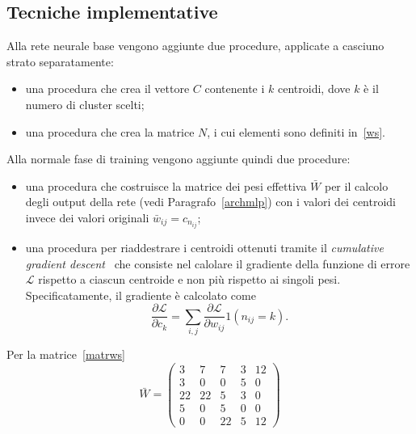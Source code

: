 \documentclass[11pt,a4paper,twoside,
openright]{book}
\begin{document}
\subsection{Tecniche implementative}
\label{implws}
Alla rete neurale base vengono aggiunte due procedure, applicate a casciuno strato separatamente:
\begin{itemize}
\item una procedura che crea il vettore $C$ contenente i $k$ centroidi, dove $k$ è il numero di cluster scelti;
\item una procedura che crea la matrice $N$, i cui elementi sono definiti in~\eqref{ws}.
\end{itemize}
Alla normale fase di training vengono aggiunte quindi due procedure:
\begin{itemize}
\item una procedura che costruisce la matrice dei pesi effettiva $\bar{W}$ per il calcolo degli output della rete (vedi Paragrafo~\ref{archmlp}) con i valori dei centroidi invece dei valori originali $\bar{w}_{ij} = c_{n_{ij}}$;
\item una procedura per riaddestrare i centroidi ottenuti tramite il \textit{cumulative gradient descent}~\cite{han2015compression} che consiste nel calolare il gradiente della funzione di errore $\mathcal{L}$ rispetto a ciascun centroide e non più rispetto ai singoli pesi. Specificatamente, il gradiente è calcolato come
\begin{equation}
\frac{\partial \mathcal{L}}{\partial c_{k}}=\sum\limits_{i,j}\frac{\partial \mathcal{L}}{\partial w_{ij}}1(n_{ij}=k).
\label{gradientews}
\end{equation}
\end{itemize}
Per la matrice~\ref{matrws}
\begin{equation}
\bar{W}=
\begin{pmatrix} 
3 & 7 & 7 & 3 & 12\\
3 & 0 & 0 & 5 & 0\\
22 & 22 & 5 & 3 & 0\\
5 & 0 & 5 & 0 & 0\\
0 & 0 & 22 & 5 & 12 
\end{pmatrix}
\label{wprimoes}
\end{equation}
\end{document}
